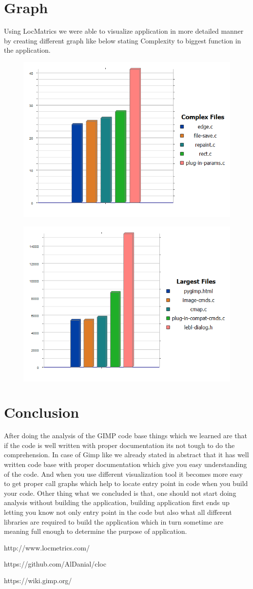 \section{Graph}
Using LocMatrics we were able to visualize application in more detailed manner by creating different graph like below stating Complexity to biggest function in the application. 
\begin{figure}[h]
	\centering
	\includegraphics[width=0.7\linewidth]{9}
	\caption{}
	\label{fig:9}
\end{figure}
\newpage
\begin{figure}[h]
	\centering
	\includegraphics[width=0.7\linewidth]{6}
	\caption{}
	\label{fig:6}
\end{figure}

\section{Conclusion}
After doing the analysis of the GIMP code base things which we learned are that if the code is well written with proper documentation its not tough to do the comprehension. In case of Gimp like we already stated in abstract that it has well written code base with proper documentation which give you easy understanding of the code. And when you use different visualization tool it becomes more easy to get proper call graphs which help to locate entry point in code when you build your code. Other thing what we concluded is that, one should not start doing analysis without building the application, building application first ends up letting you know not only entry point in the code but also what all different libraries are required to build the application which in turn sometime are meaning full enough to determine the purpose of application.

\newpage
\begin{thebibliography}{9}
	http://www.locmetrics.com/
	
	https://github.com/AlDanial/cloc
	
	https://wiki.gimp.org/
	
	
	
\end{thebibliography}

